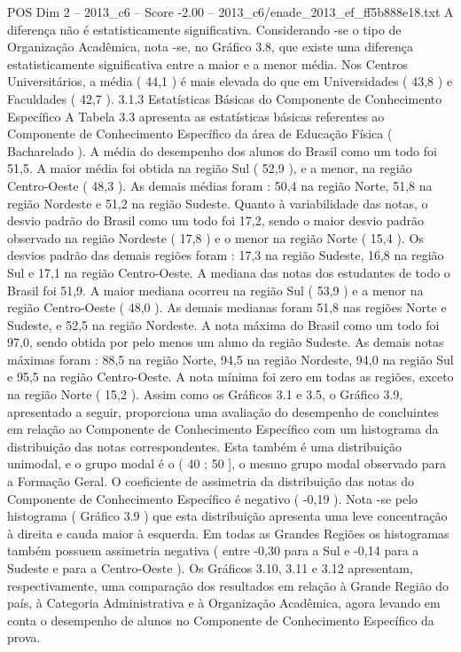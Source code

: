 \begin{textsample}{POS Dim 2 – 2013\_c6 – Score -2.00 – 2013\_c6/enade\_2013\_ef\_ff5b888e18.txt}
A diferença não é estatisticamente significativa.
Considerando -se o tipo de Organização Acadêmica, nota -se, no Gráfico 3.8, que existe uma diferença estatisticamente significativa entre a maior e a menor média.
Nos Centros Universitários, a média ( 44,1 ) é mais elevada do que em Universidades ( 43,8 ) e Faculdades ( 42,7 ). 3.1.3 Estatísticas Básicas do Componente de Conhecimento Específico A Tabela 3.3 apresenta as estatísticas básicas referentes ao Componente de Conhecimento Específico da área de Educação Física ( Bacharelado ).
A média do desempenho dos alunos do Brasil como um todo foi 51,5.
A maior média foi obtida na região Sul ( 52,9 ), e a menor, na região Centro-Oeste ( 48,3 ).
As demais médias foram : 50,4 na região Norte, 51,8 na região Nordeste e 51,2 na região Sudeste.
Quanto à variabilidade das notas, o desvio padrão do Brasil como um todo foi 17,2, sendo o maior desvio padrão observado na região Nordeste ( 17,8 ) e o menor na região Norte ( 15,4 ).
Os desvios padrão das demais regiões foram : 17,3 na região Sudeste, 16,8 na região Sul e 17,1 na região Centro-Oeste.
A mediana das notas dos estudantes de todo o Brasil foi 51,9.
A maior mediana ocorreu na região Sul ( 53,9 ) e a menor na região Centro-Oeste ( 48,0 ).
As demais medianas foram 51,8 nas regiões Norte e Sudeste, e 52,5 na região Nordeste.
A nota máxima do Brasil como um todo foi 97,0, sendo obtida por pelo menos um aluno da região Sudeste.
As demais notas máximas foram : 88,5 na região Norte, 94,5 na região Nordeste, 94,0 na região Sul e 95,5 na região Centro-Oeste.
A nota mínima foi zero em todas as regiões, exceto na região Norte ( 15,2 ).
Assim como os Gráficos 3.1 e 3.5, o Gráfico 3.9, apresentado a seguir, proporciona uma avaliação do desempenho de concluintes em relação ao Componente de Conhecimento Específico com um histograma da distribuição das notas correspondentes.
Esta também é uma distribuição unimodal, e o grupo modal é o ( 40 ; 50 ], o mesmo grupo modal observado para a Formação Geral.
O coeficiente de assimetria da distribuição das notas do Componente de Conhecimento Específico é negativo ( -0,19 ).
Nota -se pelo histograma ( Gráfico 3.9 ) que esta distribuição apresenta uma leve concentração à direita e cauda maior à esquerda.
Em todas as Grandes Regiões os histogramas também possuem assimetria negativa ( entre -0,30 para a Sul e -0,14 para a Sudeste e para a Centro-Oeste ).
Os Gráficos 3.10, 3.11 e 3.12 apresentam, respectivamente, uma comparação dos resultados em relação à Grande Região do país, à Categoria Administrativa e à Organização Acadêmica, agora levando em conta o desempenho de alunos no Componente de Conhecimento Específico da prova.

\end{textsample}
